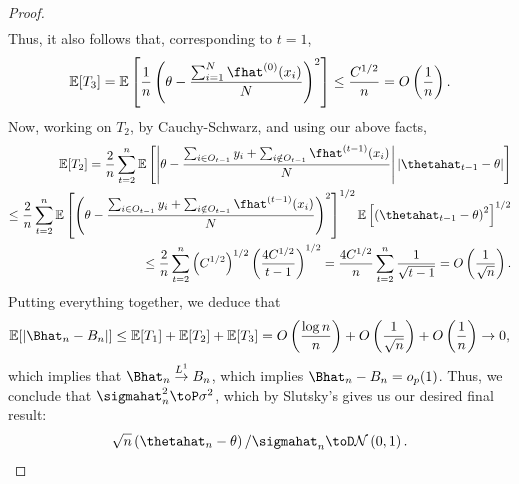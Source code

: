 \documentclass[11pt]{article}
\begin{document}
\begin{proof}
\begin{align*}
    \end{align*}
    Thus, it also follows that, corresponding to $t=1$,
    \begin{align*}
        \mathbb{E}[T_3] = \mathbb{E}\left[ \frac{1}{n} \left( \theta - \frac{\sum_{i=1}^N \fhat^{(0)}(x_i)}{N} \right)^2 \right] \leq \frac{C^{1/2}}{n} = O\left( \frac{1}{n} \right).
    \end{align*}
    Now, working on $T_2$, by Cauchy-Schwarz, and using our above facts,
    \begin{align*}
        \mathbb{E}[T_2] = \frac{2}{n} \sum_{t=2}^n \mathbb{E}\left[ \left| \theta - \frac{\sum_{i \in O_{t-1}} y_i + \sum_{i \notin O_{t-1}} \fhat^{(t-1)}(x_i)}{N} \right| \left| \thetahat_{t-1} - \theta \right| \right]\\
        \leq \frac{2}{n} \sum_{t=2}^n \mathbb{E}\left[ \left( \theta - \frac{\sum_{i \in O_{t-1}} y_i + \sum_{i \notin O_{t-1}} \fhat^{(t-1)}(x_i)}{N} \right)^2 \right]^{1/2} \mathbb{E}\left[ \left( \thetahat_{t-1} - \theta \right)^2 \right]^{1/2}\\
        \leq \frac{2}{n}\sum_{t=2}^n \left( C^{1/2}\right)^{1/2}\left( \frac{4C^{1/2}}{t-1} \right)^{1/2} = \frac{4C^{1/2}}{n} \sum_{t=2}^n \frac{1}{\sqrt{t-1}} = O\left(  \frac{1}{\sqrt{n}} \right).
    \end{align*}
    Putting everything together, we deduce that
    \begin{align*}
        \mathbb{E}[|\Bhat_n - B_n|] \leq \mathbb{E}[T_1] + \mathbb{E}[T_2] + \mathbb{E}[T_3] = O\left( \frac{\log n}{n} \right) + O\left(  \frac{1}{\sqrt{n}} \right) + O\left( \frac{1}{n} \right) \to 0,
    \end{align*}
    which implies that $\Bhat_n \overset{L^1}{\to} B_n$, which implies $\Bhat_n - B_n = o_p(1)$. Thus, we conclude that $\sigmahat_n^2 \toP \sigma^2$, which by Slutsky's gives us our desired final result:
    \begin{align*}
        \sqrt{n}\left( \thetahat_n - \theta \right) / \sigmahat_{n} \toD \mathcal{N}\left( 0, 1\right).
    \end{align*}
\end{proof}
\end{document}
